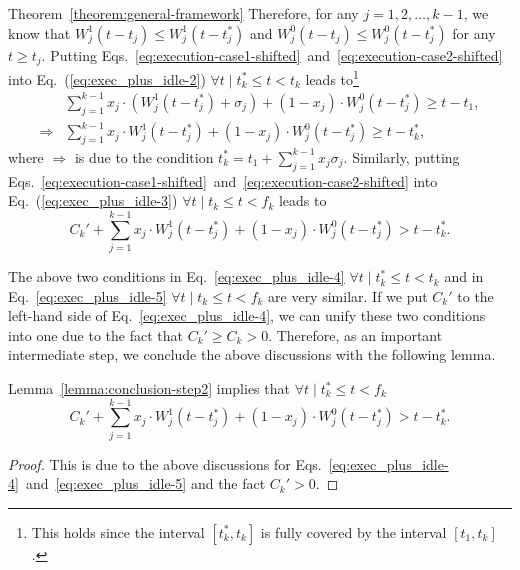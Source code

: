 \begin{appProof}{Theorem~\ref{theorem:general-framework}}
Therefore, for any $j=1,2,\ldots,k-1$, we know that $W_j^1(t-t_j)
\leq W_j^1(t-t_j^*)$ and $W_j^0(t-t_j) \leq W_j^0(t-t_j^*)$ for any $t
\geq t_j$. Putting Eqs.~\eqref{eq:execution-case1-shifted}~and~\eqref{eq:execution-case2-shifted} into 
Eq.~(\ref{eq:exec_plus_idle-2}) $\forall t \mid t_k^* \leq t < t_k$ leads to\footnote{This holds since the interval $[t_k^*, t_k]$ is fully covered by the interval $[t_1, t_k]$.}
{\small \begin{align}
&\sum_{j=1}^{k-1} x_j\cdot (W_j^1(t-t_j^*)+\sigma_j) + (1-x_j)\cdot W_j^0(t-t_j^*) \geq t-t_1,\nonumber\\
\Rightarrow& \sum_{j=1}^{k-1} x_j\cdot W_j^1(t-t_j^*) + (1-x_j)\cdot W_j^0(t-t_j^*) \geq t-t_k^*,
\label{eq:exec_plus_idle-4}
\end{align}}where $\Rightarrow$ is due to the condition
$t_k^* = t_1 + \sum_{j=1}^{k-1}x_j\sigma_j$.
Similarly, putting Eqs.~\eqref{eq:execution-case1-shifted}~and~\eqref{eq:execution-case2-shifted} into 
Eq.~(\ref{eq:exec_plus_idle-3}) $\forall t \mid t_k \leq t < f_k$ leads to 
\begin{equation}
\label{eq:exec_plus_idle-5}
C_k'+\sum_{j=1}^{k-1} x_j\cdot W_j^1(t-t_j^*) + (1-x_j)\cdot W_j^0(t-t_j^*) > t-t_k^*.
\end{equation}

The above two conditions in Eq.~\eqref{eq:exec_plus_idle-4} $\forall t \mid t_k^* \leq t < t_k$ and in Eq.~\eqref{eq:exec_plus_idle-5} $\forall t \mid t_k \leq t < f_k$ are very similar. If we put $C_k'$ to the left-hand side of Eq.~\eqref{eq:exec_plus_idle-4}, we can unify these two conditions into one due to the fact that $C_k' \geq C_k > 0$. Therefore, as an important intermediate step, we conclude the above discussions with the following lemma.

\begin{Lemma}
\label{lemma:step-3-one-condition}
Lemma~\ref{lemma:conclusion-step2} implies that
$\forall t \mid t_k^* \leq t < f_k$
\begin{equation}
\label{eq:exec_plus_idle-almost-final} 
C_k'+\sum_{j=1}^{k-1} x_j\cdot W_j^1(t-t_j^*) + (1-x_j)\cdot W_j^0(t-t_j^*) > t-t_k^*.
\end{equation}  
\end{Lemma}
\begin{proof}
  This is due to the above discussions for Eqs.~\eqref{eq:exec_plus_idle-4}~and~\eqref{eq:exec_plus_idle-5} and the fact $C_k' > 0$.
\end{proof}


\end{appProof}
